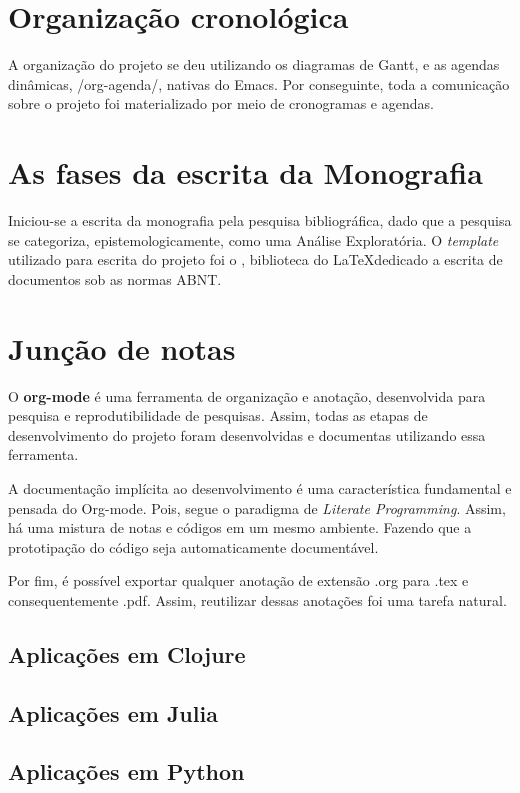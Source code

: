 \documentclass[
12pt,				%
openright,			%
oneside,			%
a4paper,			%
brazil,				%
english,			%
]{abntex2}
\begin{document}
\section{Organização cronológica}

A organização do projeto se deu utilizando os diagramas de Gantt, e as
agendas dinâmicas, /org-agenda/, nativas do Emacs. Por conseguinte,
toda a comunicação sobre o projeto foi materializado por meio de
cronogramas e agendas.

\section{As fases da escrita da Monografia}
Iniciou-se a escrita da monografia pela pesquisa bibliográfica, dado
que a pesquisa se categoriza, epistemologicamente, como uma Análise
Exploratória. O \textit{template} utilizado para escrita do projeto
foi o \abnTeX{}, biblioteca do \LaTeX dedicado a escrita de documentos sob as normas ABNT.

\section{Junção de notas}
O \textbf{org-mode} é uma ferramenta de organização e anotação, desenvolvida
para pesquisa e reprodutibilidade de pesquisas. Assim, todas as etapas
de desenvolvimento do projeto foram desenvolvidas e documentas utilizando
essa ferramenta.

A documentação implícita ao desenvolvimento é uma
característica fundamental e pensada do Org-mode. Pois, segue o
paradigma de \textit{Literate Programming}. Assim, há uma mistura de
notas e códigos em um mesmo ambiente. Fazendo que a prototipação do
código seja automaticamente documentável.

Por fim, é possível exportar qualquer anotação de extensão .org para
.tex e consequentemente .pdf. Assim, reutilizar dessas anotações foi
uma tarefa natural.

\subsection{Aplicações em Clojure}

\subsection{Aplicações em Julia}
\subsection{Aplicações em Python}
\end{document}
